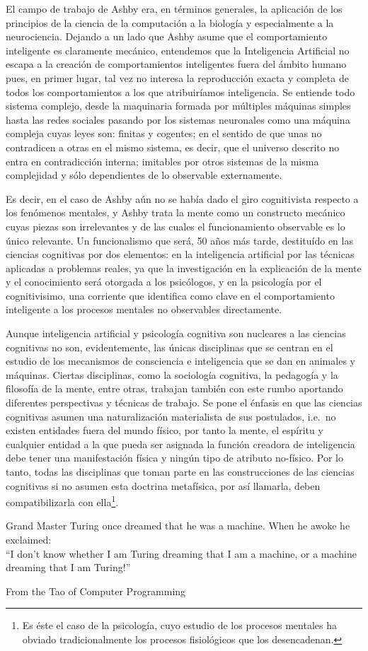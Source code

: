 \documentclass[12pt]{memoir}
\begin{document}
\begin{appendices}
El campo de trabajo de Ashby era, en términos generales, la aplicación de los principios de la ciencia de la computación a la biología y especialmente a la neurociencia. Dejando a un lado que Ashby asume que el comportamiento inteligente es claramente mecánico, entendemos que la Inteligencia Artificial no escapa a la creación de comportamientos inteligentes fuera del ámbito humano pues, en primer lugar, tal vez no interesa la reproducción exacta y completa de todos los comportamientos a los que atribuiríamos inteligencia. Se entiende todo sistema complejo, desde la maquinaria formada por múltiples máquinas simples hasta las redes sociales pasando por los sistemas neuronales como una máquina compleja cuyas leyes son: finitas y cogentes; en el sentido de que unas no contradicen a otras en el mismo sistema, es decir, que el universo descrito no entra en contradicción interna; imitables por otros sistemas de la misma complejidad y sólo dependientes de lo observable externamente.
 
Es decir, en el caso de Ashby aún no se había dado el giro cognitivista respecto a los fenómenos mentales, y Ashby trata la mente como un constructo mecánico cuyas piezas son irrelevantes y de las cuales el funcionamiento observable es lo único relevante. Un funcionalismo que será, 50 años más tarde, destituído en las ciencias cognitivas por dos elementos: en la inteligencia artificial por las técnicas aplicadas a problemas reales, ya que la investigación en la explicación de la mente y el conocimiento será otorgada a los psicólogos, y en la psicología por el cognitivisimo, una corriente que identifica como clave en el comportamiento inteligente a los procesos mentales no observables directamente. 

Aunque inteligencia artificial y psicología cognitiva son nucleares a las ciencias cognitivas no son, evidentemente, las únicas disciplinas que se centran en el estudio de los mecanismos de consciencia e inteligencia que se dan en animales y máquinas. Ciertas disciplinas, como la sociología cognitiva, la pedagogía y la filosofía de la mente, entre otras, trabajan también con este rumbo aportando diferentes perspectivas y técnicas de trabajo. Se pone el énfasis en que las ciencias cognitivas asumen una naturalización materialista de sus postulados, i.e.\ no existen entidades fuera del mundo físico, por tanto la mente, el espíritu y cualquier entidad a la que pueda ser asignada la función creadora de inteligencia debe tener una manifestación física y ningún tipo de atributo no-físico. Por lo tanto, todas las disciplinas que toman parte en las construcciones de las ciencias cognitivas si no asumen esta doctrina metafísica, por así llamarla, deben compatibilizarla con ella\footnote{Es éste el caso de la psicología, cuyo estudio de los procesos mentales ha obviado tradicionalmente los procesos fisiológicos que los desencadenan.}.
\end{appendices}



\newpage

\printbibliography

\newpage
\epigraph{Grand Master Turing once dreamed that he was a machine. When he awoke he exclaimed: \\

“I don't know whether I am Turing dreaming that I am a machine, or a machine dreaming that I am Turing!”}{From the Tao of Computer Programming}
\end{document}
